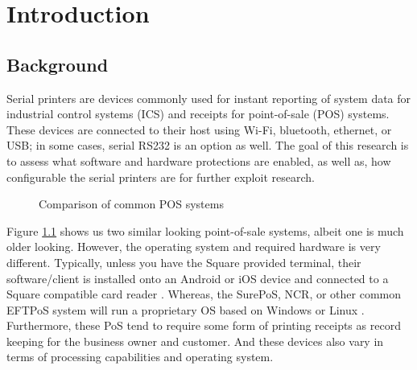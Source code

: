 \chapter{\leavevmode Introduction}
\label{chap:introduction}

\section{Background}  \label{background}

Serial printers are devices commonly used for instant reporting of system data for industrial control systems (ICS) and receipts for point-of-sale (POS) systems. These devices are connected to their host using Wi-Fi, bluetooth, ethernet, or USB; in some cases, serial RS232 is an option as well. The goal of this research is to assess what software and hardware protections are enabled, as well as, how configurable the serial printers are for further exploit research.


\begin{figure}[ht]%
  \centering
  \qquad
  \caption{Comparison of common POS systems}%
  \label{fig:comparison_pos}%
\end{figure}

Figure \ref{fig:comparison_pos} shows us two similar looking point-of-sale systems, albeit one is much older looking. However, the operating system and required hardware is very different. Typically, unless you have the Square provided terminal, their software/client is installed onto an Android or iOS device and connected to a Square compatible card reader \autocite{ondrusMobilePaymentsMarket2011}. Whereas, the SurePoS, NCR, or other common EFTPoS system will run a proprietary OS based on Windows or Linux \autocite{ebimoboweiROLESOFTWARECASHLESS2018}. Furthermore, these PoS tend to require some form of printing receipts as record keeping for the business owner and customer. And these devices also vary in terms of processing capabilities and operating system.

